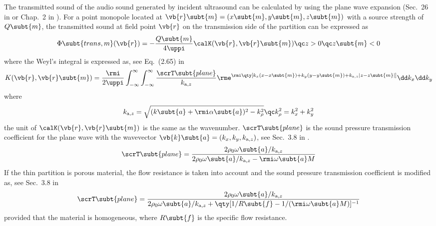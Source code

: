 The transmitted sound of the audio sound generated
by incident ultrasound can be calculated by using the
plane wave expansion (Sec.~26 in \cite{Brekhovskikh1980WavesLayeredMedia} or Chap.~2 in
\cite{Williams1999FourierAcousticsSound}). 
For a point monopole located at $\vb{r}\subt{m} = (x\subt{m}, y\subt{m},z\subt{m})$ 
with a source strength of $Q\subt{m}$, the transmitted sound at
field point $\vb{r}$ on the transmission side of the partition can
be expressed as \cite{Shi2008SoundInsulationInfinite}
\begin{equation}
    \Phi\subt{trans, m} (\vb{r}) = 
    -\frac{Q\subt{m} }{4\uppi}
    \calK(\vb{r},\vb{r}\subt{m})\qc
    z>0\qc z\subt{m} < 0
\end{equation}
where the Weyl's integral is expressed as, see Eq.~(2.65) in \cite{Williams1999FourierAcousticsSound}
\begin{equation}
    K(\vb{r},\vb{r}\subt{m})
    =
    \frac{\rmi}{2\uppi}
    \int_{-\infty}^\infty
    \int_{-\infty}^\infty
    \frac{\scrT \subt{plane} }{k_{\mathrm{a}, z}} 
    \rme^{\rmi \qty[k_x(x-x\subt{m}) + k_y(y-y\subt{m}) + k_{\mathrm{a},z}|z-z\subt{m}|]}
    \dd k_x \dd k_y
    \label{eq:weyl39f}
\end{equation}
where 
\begin{equation}
    k_{\mathrm{a},z} = \sqrt{(k\subt{a} + \rmi \alpha\subt{a})^2 - k_\rho^2}
    \qc
    k_\rho^2 = k_x^2+k_y^2
\end{equation}
the unit of $\calK(\vb{r},\vb{r}\subt{m})$ is the same as the wavenumber.
$\scrT\subt{plane}$ is the
sound pressure transmission coefficient for the plane wave
with the wavevector $\vb{k}\subt{a} = (k_x,k_y, k_{\mathrm{a},z})$, see Sec.~3.8 in \cite{Pierce2019AcousticsIntroductionIts}.
\begin{equation}
    \scrT\subt{plane}
    = \frac{2\rho_0\omega\subt{a} / k_{\mathrm{a},z}}{2\rho_0\omega\subt{a}/k_{\mathrm{a},z} - \rmi \omega\subt{a} M}
\end{equation}
If the thin partition is porous material, the flow resistance is
taken into account and the sound pressure transmission coefficient
is modified as, see Sec.~3.8 in \cite{Pierce2019AcousticsIntroductionIts}
\begin{equation}
    \scrT\subt{plane}
    = \frac{2\rho_0\omega\subt{a} / k_{\mathrm{a},z}}{2\rho_0\omega\subt{a}/k_{\mathrm{a},z} + \qty[1/R\subt{f} -1/(\rmi \omega\subt{a} M)]^{-1}}
\end{equation}
provided that the material is homogeneous, where $R\subt{f}$ is the
specific flow resistance.

